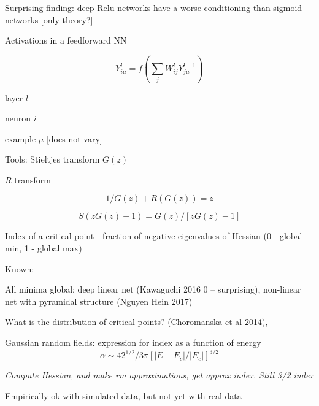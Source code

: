 \documentclass[english]{article}
\begin{document}
Surprising finding: deep Relu networks have a worse conditioning than sigmoid networks [only theory?]

\item Activations in a feedforward NN

$$Y_{i\mu}^l = f(\sum_j W_{ij}^l Y_{j\mu}^{l-1})$$

\benum
\item layer $l$

\item neuron $i$

\item example $\mu$ [does not vary]
\eenum
\item Tools: 
Stieltjes transform $G(z)$

$R$ transform

$$1/G(z) + R(G(z)) = z$$

$$S(zG(z)-1) = G(z)/[zG(z)-1]$$


\item Index of a critical point - fraction of negative eigenvalues of Hessian (0 - global min, 1 - global max)

Known:

All minima global: deep linear net (Kawaguchi 2016 0 -- surprising), non-linear net with pyramidal structure (Nguyen Hein 2017)

\item 
What is the distribution of critical  points? (Choromanska et al 2014), 

Gaussian random fields: expression for index as a function of energy $$\alpha \sim 42^{1/2}/3\pi [|E - E_c|/|E_c|]^{3/2}$$

\emph{Compute Hessian, and make rm approximations, get approx index. Still 3/2 index}

Empirically ok with simulated data, but not yet with real data
%
%
%
%
%
\eenum
\end{document}
